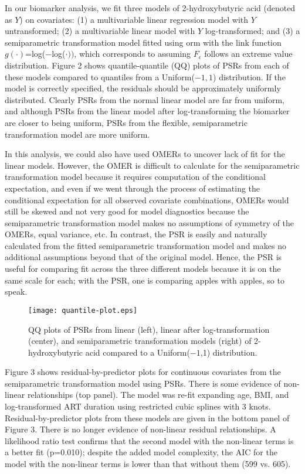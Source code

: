 \documentclass[12pt, usenatbib]{article}
\begin{document}
In our biomarker analysis, we fit three models of 2-hydroxybutyric acid (denoted as $Y$) on covariates: (1) a multivariable linear regression model with $Y$ untransformed; (2) a multivariable linear model with $Y$ log-transformed; and (3) a semiparametric transformation model fitted using orm with the link function $g(\cdot)$=log($-$log($\cdot))$, which corresponds to assuming $F_{\epsilon}$ follows an extreme value distribution.
Figure 2 shows quantile-quantile (QQ) plots of PSRs from each of these models compared to quantiles from a Uniform($-1,1$) distribution.  If the model is correctly specified, the residuals should be approximately uniformly distributed.  Clearly PSRs from the normal linear model are far from uniform, and although PSRs from the linear model after log-transforming the biomarker are closer to being uniform, PSRs from the flexible, semiparametric transformation model are more uniform.  

In this analysis, we could also have used OMERs to uncover lack of fit for the linear models.  However, the OMER is difficult to calculate for the semiparametric transformation model because it requires computation of the conditional expectation, and even if we went through the process of estimating the conditional expectation for all observed covariate combinations, OMERs would still be skewed and not very good for model diagnostics because the semiparametric transformation model makes no assumptions of symmetry of the OMERs, equal variance, etc.  In contrast, the PSR is easily and naturally calculated from the fitted semiparametric transformation model and makes no additional assumptions beyond that of the original model. 
Hence, the PSR is useful for comparing fit across the three different models because it is on the same scale for each; with the PSR, one is comparing apples with apples, so to speak.


\begin{figure}
\begin{center}
\texttt{[image: quantile-plot.eps]}
\end{center}
\caption{QQ plots of PSRs from linear (left), linear after log-transformation (center), and semiparametric transformation models (right) of 2-hydroxybutyric acid compared to a Uniform($-1$,1) distribution.}
\label{fig2}
\end{figure}  


Figure 3 shows residual-by-predictor plots for continuous covariates from the semiparametric transformation model using PSRs.  There is some evidence of non-linear relationships (top panel).  The model was re-fit expanding age, BMI, and log-transformed ART duration using restricted cubic splines with 3 knots.  Residual-by-predictor plots from these models are given in the bottom panel of Figure 3.  There is no longer evidence of non-linear residual relationships.  A likelihood ratio test confirms that the second model with the non-linear terms is a better fit (p=0.010); despite the added model complexity, the AIC for the model with the non-linear terms is lower than that without them (599 vs. 605). 
\end{document}
